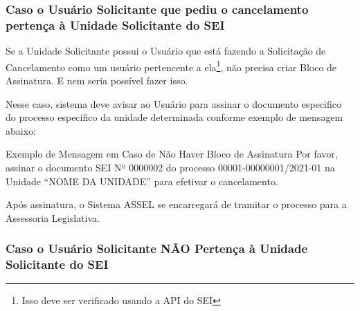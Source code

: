 \subsubsection{Caso o Usuário Solicitante que pediu o cancelamento pertença à Unidade Solicitante do SEI}

Se a Unidade Solicitante possui o Usuário que está fazendo a Solicitação de Cancelamento como um usuário pertencente a ela\footnote{Isso deve ser verificado usando a API do SEI}, não precisa criar Bloco de Assinatura. E nem seria possível fazer isso. 

Nesse caso, sistema deve avisar ao Usuário para assinar o documento especifico do processo especifico da unidade determinada conforme exemplo de mensagem abaixo:


\begin{exemplo}[1]{Exemplo de Mensagem em Caso de Não Haver Bloco de Assinatura}
	Por favor, assinar o documento SEI Nº 0000002 do processo 00001-00000001/2021-01 na Unidade ``NOME DA UNIDADE'' para efetivar o cancelamento. 
	
	\vphantom{espaço vertical em branco}			
	
	Após assinatura, o Sistema ASSEL se encarregará de tramitar o processo para a Assessoria Legislativa.
	
	\vphantom{espaço vertical em branco}					
	
\end{exemplo}



\subsubsection{Caso o Usuário Solicitante NÃO Pertença à Unidade Solicitante do SEI}


